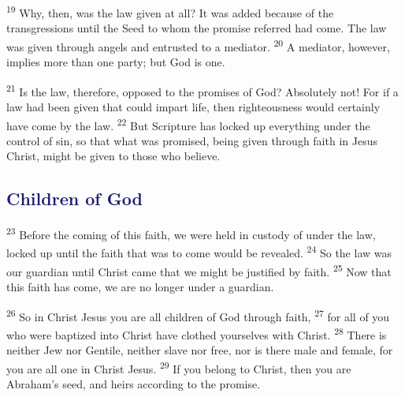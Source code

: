\documentclass[12pt,twoside]{article}
\newcommand{\vs}[1]{\textsuperscript{#1}}
\begin{document}
 \vs{19} Why, then, was the law given at all? It was added because of the transgressions until the Seed to whom the promise referred had come. The law was given through angels and entrusted to a mediator.
 \vs{20} A mediator, however, implies more than one party; but God is one.

 \vs{21} Is the law, therefore, opposed to the promises of God? Absolutely not! For if a law had been given that could impart life, then righteousness would certainly have come by the law.
 \vs{22} But Scripture has locked up everything under the control of sin, so that what was promised, being given through faith in Jesus Christ, might be given to those who believe.

 \subsection*{\textcolor{MidnightBlue}{\textbf{Children of God}}}

 \hspace{0.5cm} \vs{23} Before the coming of this faith, we were held in custody of under the law, locked up until the faith that was to come would be revealed.
 \vs{24} So the law was our guardian until Christ came that we might be justified by faith.
 \vs{25} Now that this faith has come, we are no longer under a guardian.

 \vs{26} So in Christ Jesus you are all children of God through faith,
 \vs{27} for all of you who were baptized into Christ have clothed yourselves with Christ.
 \vs{28} There is neither Jew nor Gentile, neither slave nor free, nor is there male and female, for you are all one in Christ Jesus.
 \vs{29} If you belong to Christ, then you are Abraham's seed, and heirs according to the promise.
\end{document}
